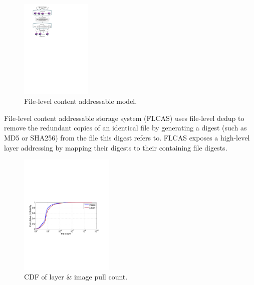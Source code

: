 \begin{figure}
	\centering
	\includegraphics[width=0.3\textwidth]{graphs/graph_compression_layers.pdf}
	\caption{File-level content addressable model.
	}
	\label{fig:file-dedup-model}
\end{figure}

File-level content addressable storage system (FLCAS) uses file-level dedup to remove the redundant copies of an identical file by generating a digest (such as MD5 or SHA256) from the file this digest refers to.
%
%
FLCAS exposes a high-level layer addressing by mapping their digests to their containing file digests.     
%
%
%


\begin{figure}
	\centering
	\includegraphics[width=0.4\textwidth]{graphs/pull-cnt.pdf}
	\caption{CDF of layer \& image pull count.
	}
	\label{fig:pull-cnt}
\end{figure}

